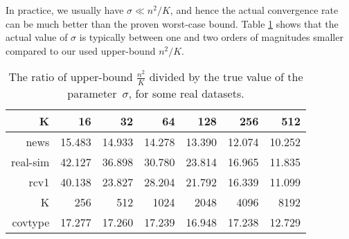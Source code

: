 \documentclass{article}
\newcommand{\0}{ {\bf 0}}
\theoremstyle{plain}
\theoremstyle{definition}
\begin{document}
In practice, we usually have $\sigma \ll n^2/K$, and hence the actual convergence rate can be much better than the proven worst-case bound.
Table \ref{tbl:Sigma}
shows that the actual value of $\sigma$ is typically between one and two orders of magnitudes smaller compared to our used upper-bound $n^2/K$.
\vspace{-1em} 

\begin{table}[h]
  \centering
  \caption{The ratio of upper-bound $\tfrac{n^2}{K}$ divided by the true value of the parameter~$\sigma$, for some real datasets. }
    \vspace{1mm}
  \label{tbl:Sigma}
  \scriptsize
    \begin{tabular}{rrrrrrr}
    \toprule
    K     & 16    & 32    & 64    & 128   & 256   & 512 \\
    \midrule
    news  & 15.483 & 14.933 & 14.278 & 13.390 & 12.074 & 10.252 \\
    real-sim & 42.127 & 36.898 & 30.780 & 23.814 & 16.965 & 11.835 \\
    rcv1  & 40.138 & 23.827 & 28.204 & 21.792 & 16.339 & 11.099 \\
     \midrule
    K     & 256   & 512   & 1024  & 2048  & 4096  & 8192 \\
    \midrule
    covtype & 17.277 & 17.260 & 17.239 & 16.948 & 17.238 & 12.729 
\\ \bottomrule
    \end{tabular} 
\end{table}%
    \vspace{-1mm}
\end{document}
